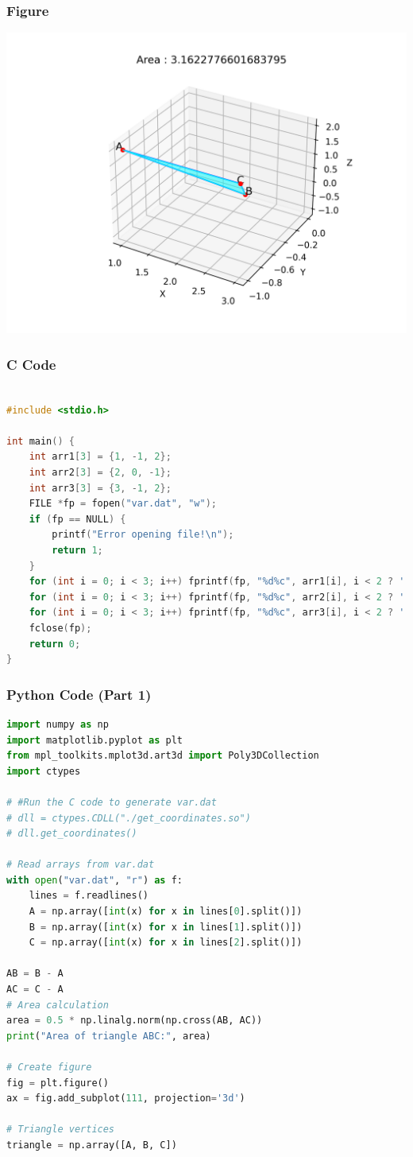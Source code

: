 \documentclass{beamer}
\begin{document}
\begin{frame}
\frametitle{Figure}
\begin{center}
\includegraphics[width=0.7\linewidth]{figs/fig.png}
\end{center}
\end{frame}

\begin{frame}[fragile]
\frametitle{C Code}
\begin{lstlisting}[language=C]

#include <stdio.h>

int main() {
	int arr1[3] = {1, -1, 2};
	int arr2[3] = {2, 0, -1};
	int arr3[3] = {3, -1, 2};
	FILE *fp = fopen("var.dat", "w");
	if (fp == NULL) {
		printf("Error opening file!\n");
		return 1;
	}
	for (int i = 0; i < 3; i++) fprintf(fp, "%d%c", arr1[i], i < 2 ? ' ' : '\n');
	for (int i = 0; i < 3; i++) fprintf(fp, "%d%c", arr2[i], i < 2 ? ' ' : '\n');
	for (int i = 0; i < 3; i++) fprintf(fp, "%d%c", arr3[i], i < 2 ? ' ' : '\n');
	fclose(fp);
	return 0;
}

\end{lstlisting}
\end{frame}



\begin{frame}[fragile]
\frametitle{Python Code (Part 1)}
\begin{lstlisting}[language=Python]
import numpy as np
import matplotlib.pyplot as plt
from mpl_toolkits.mplot3d.art3d import Poly3DCollection
import ctypes

# #Run the C code to generate var.dat
# dll = ctypes.CDLL("./get_coordinates.so")
# dll.get_coordinates()

# Read arrays from var.dat
with open("var.dat", "r") as f:
	lines = f.readlines()
	A = np.array([int(x) for x in lines[0].split()])
	B = np.array([int(x) for x in lines[1].split()])
	C = np.array([int(x) for x in lines[2].split()])

AB = B - A
AC = C - A
# Area calculation
area = 0.5 * np.linalg.norm(np.cross(AB, AC))
print("Area of triangle ABC:", area)

# Create figure
fig = plt.figure()
ax = fig.add_subplot(111, projection='3d')

# Triangle vertices
triangle = np.array([A, B, C])
\end{lstlisting}
\end{frame}
\end{document}
